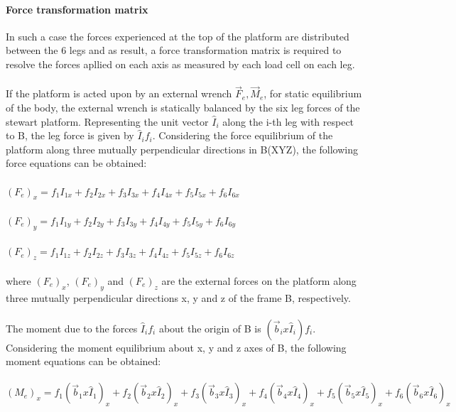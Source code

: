 \paragraph{Force transformation matrix}
In such a case the forces experienced at the top of the platform are distributed between the 6 legs and as result, a force transformation matrix is required to resolve the forces apllied on each axis as measured by each load cell on each leg. 
\paragraph{} If the platform is acted upon by an external wrench {$\vec{F}_e, \vec{M}_e$}, for static equilibrium of the body, the external wrench is statically balanced by the six leg forces of the stewart platform. Representing the unit vector $\hat{I}_i$ along the i-th leg with respect to B, the leg force is given  by $\hat{I}_if_i$. Considering the force equilibrium of the platform along  three mutually perpendicular directions in B(XYZ), the following force equations can be obtained:
\paragraph{}$(F_e)_x = f_1I_{1x} + f_2I_{2x} + f_3I_{3x} + f_4I_{4x} + f_5I_{5x} + f_6I_{6x}$
\paragraph{}$(F_e)_y = f_1I_{1y} + f_2I_{2y} + f_3I_{3y} + f_4I_{4y} + f_5I_{5y} + f_6I_{6y}$
\paragraph{}$(F_e)_z = f_1I_{1z} + f_2I_{2z} + f_3I_{3z} + f_4I_{4z} + f_5I_{5z} + f_6I_{6z}$
\paragraph{} where $(F_e)_x$, $(F_e)_y$ and $(F_e)_z$ are the external forces on the platform along three mutually perpendicular directions x, y and z of the frame B, respectively.
\paragraph{} The moment due to the forces $\hat{I}_if_i$ about the origin of B is $(\vec{b}_i x \hat{I}_i)f_i$. Considering the moment equilibrium about x, y and z axes of B, the following moment equations can be obtained:
\paragraph{}$(M_e)_x = f_1(\vec{b}_1 x \hat{I}_1)_x + f_2(\vec{b}_2 x \hat{I}_2)_x + f_3(\vec{b}_3 x \hat{I}_3)_x + f_4(\vec{b}_4 x \hat{I}_4)_x + f_5(\vec{b}_5 x \hat{I}_5)_x + f_6(\vec{b}_6 x \hat{I}_6)_x$
